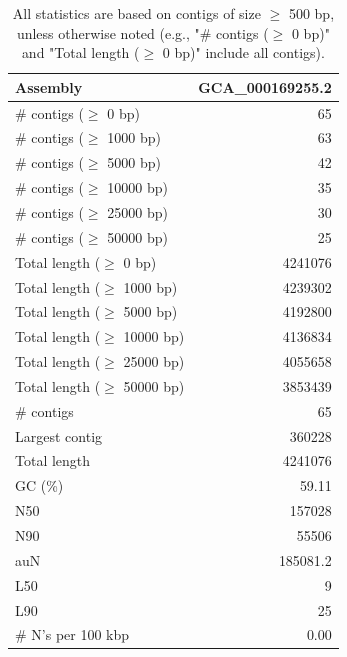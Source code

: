 \documentclass[12pt,a4paper]{article}
\begin{document}
\begin{table}[ht]
\begin{center}
\caption{All statistics are based on contigs of size $\geq$ 500 bp, unless otherwise noted (e.g., "\# contigs ($\geq$ 0 bp)" and "Total length ($\geq$ 0 bp)" include all contigs).}
\begin{tabular}{|l*{1}{|r}|}
\hline
Assembly & GCA\_000169255.2 \\ \hline
\# contigs ($\geq$ 0 bp) & 65 \\ \hline
\# contigs ($\geq$ 1000 bp) & 63 \\ \hline
\# contigs ($\geq$ 5000 bp) & 42 \\ \hline
\# contigs ($\geq$ 10000 bp) & 35 \\ \hline
\# contigs ($\geq$ 25000 bp) & 30 \\ \hline
\# contigs ($\geq$ 50000 bp) & 25 \\ \hline
Total length ($\geq$ 0 bp) & 4241076 \\ \hline
Total length ($\geq$ 1000 bp) & 4239302 \\ \hline
Total length ($\geq$ 5000 bp) & 4192800 \\ \hline
Total length ($\geq$ 10000 bp) & 4136834 \\ \hline
Total length ($\geq$ 25000 bp) & 4055658 \\ \hline
Total length ($\geq$ 50000 bp) & 3853439 \\ \hline
\# contigs & 65 \\ \hline
Largest contig & 360228 \\ \hline
Total length & 4241076 \\ \hline
GC (\%) & 59.11 \\ \hline
N50 & 157028 \\ \hline
N90 & 55506 \\ \hline
auN & 185081.2 \\ \hline
L50 & 9 \\ \hline
L90 & 25 \\ \hline
\# N's per 100 kbp & 0.00 \\ \hline
\end{tabular}
\end{center}
\end{table}
\end{document}
